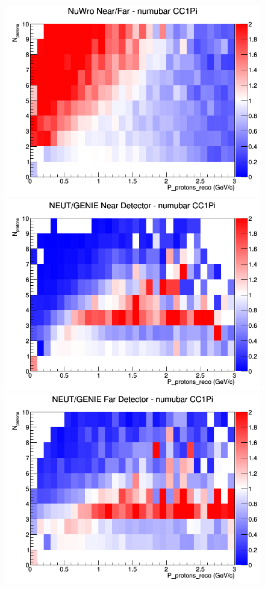 \begin{figure}[h]
\endminipage
{}
\includegraphics[width=\linewidth]{eff_N_P/GAr/protons/ratios/CC1Pi_NuWro_numubar_NF_N_P.png}
\endminipage
\newline
{}
\includegraphics[width=\linewidth]{eff_N_P/GAr/protons/ratios/CC1Pi_NEUT_GENIE_numubar_near_N_P.png}
\endminipage
{}
\includegraphics[width=\linewidth]{eff_N_P/GAr/protons/ratios/CC1Pi_NEUT_GENIE_numubar_far_N_P.png}

\end{figure}
